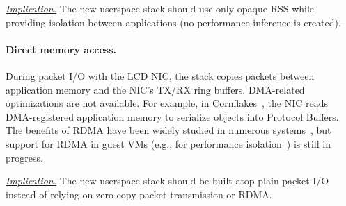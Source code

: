 \ul{\textit{Implication.}} The new userspace stack should use only opaque RSS while providing isolation between applications (no performance inference is created).

\paragraph{Direct memory access.}
During packet I/O with the LCD NIC, the stack copies packets between application memory and the NIC's TX/RX ring buffers.
DMA-related optimizations are not available.
For example, in Cornflakes~\cite{cornflakes}, the NIC reads DMA-registered application memory to serialize objects into Protocol Buffers.
The benefits of RDMA have been widely studied in numerous systems~\cite{socksdirect, mrpc, farm}, but support for RDMA in guest VMs (e.g., for performance isolation~\cite{Kong:nsdi23}) is still in progress.

\ul{\textit{Implication.}} The new userspace stack should be built atop plain packet I/O instead of relying on zero-copy packet transmission or RDMA.


